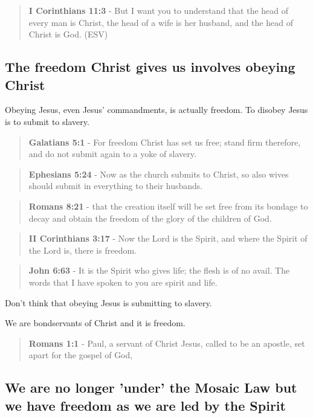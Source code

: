 \documentclass[11pt]{article}
\begin{document}
\begin{quote}
\textbf{I Corinthians 11:3} - But I want you to understand that the head of every man is Christ, the head of a wife is her husband, and the head of Christ is God. (ESV)
\end{quote}

\subsection{The freedom Christ gives us involves obeying Christ}
\label{sec:org99b4282}

Obeying Jesus, even Jesus' commandments, is actually freedom. To disobey Jesus is to submit to slavery.

\begin{quote}
\textbf{Galatians 5:1} - For freedom Christ has set us free; stand firm therefore, and do not submit again to a yoke of slavery.
\end{quote}

\begin{quote}
\textbf{Ephesians 5:24} - Now as the church submits to Christ, so also wives should submit in everything to their husbands.
\end{quote}

\begin{quote}
\textbf{Romans 8:21} - that the creation itself will be set free from its bondage to decay and obtain the freedom of the glory of the children of God.
\end{quote}

\begin{quote}
\textbf{II Corinthians 3:17} - Now the Lord is the Spirit, and where the Spirit of the Lord is, there is freedom.
\end{quote}

\begin{quote}
\textbf{John 6:63} - It is the Spirit who gives life; the flesh is of no avail. The words that I have spoken to you are spirit and life.
\end{quote}

Don't think that obeying Jesus is submitting to slavery.

We are bondservants of Christ and it is freedom.

\begin{quote}
\textbf{Romans 1:1} - Paul, a servant of Christ Jesus, called to be an apostle, set apart for the gospel of God,
\end{quote}

\subsection{We are no longer 'under' the Mosaic Law but we have freedom as we are led by the Spirit}
\label{sec:org9aece8e}
\end{document}
